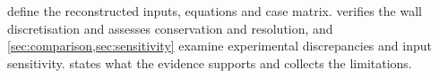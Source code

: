  define the reconstructed
inputs, equations and case matrix.  verifies the
wall discretisation and assesses conservation and resolution, and
\cref{sec:comparison,sec:sensitivity} examine experimental
discrepancies and input sensitivity.  states what
the evidence supports and collects the limitations.
